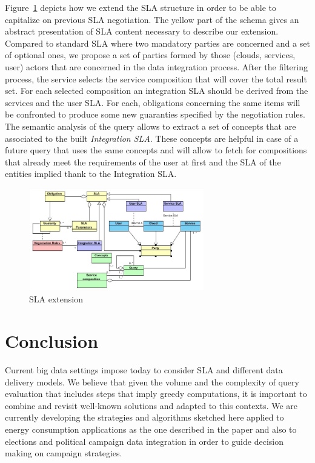 \documentclass[10pt, conference, compsocconf]{IEEEtran}
\begin{document}
Figure~\ref{fig_integ} depicts how we extend the SLA structure in order to be able to capitalize on previous SLA negotiation. 
The yellow part of the schema gives an abstract presentation of SLA content necessary to describe our extension. 
Compared to standard SLA where two mandatory parties are concerned and a set of optional ones, we propose a set of parties formed by those (clouds, services, user) actors that are concerned in the data integration process. 
After the filtering process, the service selects the service composition that will cover the total result set. 
For each selected composition an integration SLA should be derived from the services and the user SLA. 
For each, obligations concerning the same items will be confronted to produce some new guaranties specified by the negotiation rules. 
The semantic analysis of the query allows to extract a set of concepts that are associated to the built \textit{Integration SLA}. 
These concepts are helpful in case of a future query that uses the same concepts and will allow to fetch for compositions that already meet the requirements of the user at first and the SLA of the entities implied thank to the Integration SLA.
\begin{figure}[!t]
\centering
\includegraphics[width=3in]{figs/SLAexetension.jpg}
\caption{SLA extension}
\label{fig_integ}
\end{figure}



\section{Conclusion}
Current big data settings impose today to consider SLA and different data delivery models. 
We believe that given the volume and the complexity of query evaluation that includes steps that imply greedy computations, it is important to combine and revisit well-known solutions and adapted to this contexts. 
We are currently developing the strategies and algorithms sketched here applied to energy consumption applications as the one described in the paper and also to elections and political campaign data integration in order to guide decision making on campaign strategies.
\end{document}
